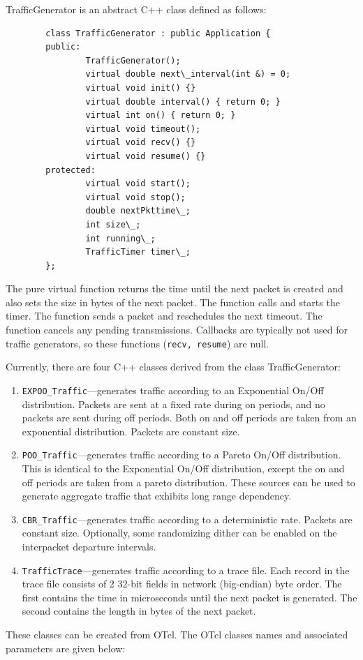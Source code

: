 TrafficGenerator is an abstract C++ class defined as follows:
\begin{verbatim}
        class TrafficGenerator : public Application {
        public:
                TrafficGenerator();
                virtual double next\_interval(int &) = 0;
                virtual void init() {}
                virtual double interval() { return 0; }
                virtual int on() { return 0; }
                virtual void timeout();
                virtual void recv() {}
                virtual void resume() {}
        protected:
                virtual void start();
                virtual void stop();
                double nextPkttime\_;
                int size\_;
                int running\_;
                TrafficTimer timer\_;
        };
\end{verbatim}
The pure virtual function  returns the time until the
next packet is created and also sets the size in bytes of the next
packet.  The function  calls  and starts the 
timer.  The function  sends a packet and reschedules the
next timeout.  The function  cancels any pending transmissions.
Callbacks are typically not used for traffic generators, so these 
functions ({\tt recv, resume}) are null.

Currently, there are four C++ classes derived from the
class TrafficGenerator:
\begin{enumerate}
\item {\tt EXPOO\_Traffic}---generates traffic according to an
  Exponential On/Off distribution.
  Packets are sent at a fixed rate during on periods, and
  no packets are sent during off periods.
  Both on and off periods are taken from an exponential distribution.
  Packets are constant size.
\item {\tt POO\_Traffic}---generates traffic
  according to a Pareto On/Off distribution.
  This is identical to the Exponential On/Off distribution,
  except the on and off periods are taken from a pareto distribution.
  These sources can be used to generate aggregate traffic
  that exhibits long range dependency.
\item {\tt CBR\_Traffic}---generates traffic according to a deterministic rate.
  Packets are constant size.  Optionally, some randomizing dither can be
  enabled on the interpacket departure intervals. 
\item {\tt TrafficTrace}---generates traffic according to a trace file.
  Each record in the trace file consists of 2 32-bit fields
   in network (big-endian) byte order.
  The first contains the time in microseconds
  until the next packet is generated.
  The second contains the length in bytes of the next packet.
\end{enumerate}
These classes can be created from OTcl.  The OTcl classes names and
associated parameters are given below:

